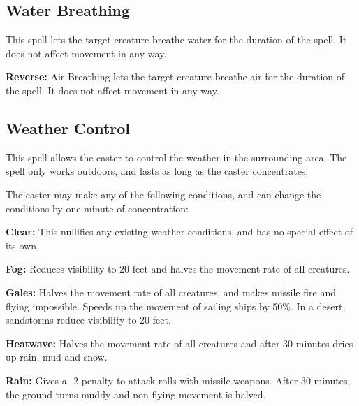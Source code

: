 \begin{multicols*}{2}
\subsection{Water Breathing}\label{spell:Water Breathing}

This spell lets the target creature breathe water for the duration of the spell. It does not affect movement in any way.

\textbf{Reverse:} Air Breathing lets the target creature breathe air for the duration of the spell. It does not affect movement in any way.

\subsection{Weather Control}\label{spell:Weather Control}

This spell allows the caster to control the weather in the surrounding area. The spell only works outdoors, and lasts as long as the caster concentrates.

The caster may make any of the following conditions, and can change the conditions by one minute of concentration:

\textbf{Clear:} This nullifies any existing weather conditions, and has no special effect of its own.

\textbf{Fog:} Reduces visibility to 20 feet and halves the movement rate of all creatures.

\textbf{Gales:} Halves the movement rate of all creatures, and makes missile fire and flying impossible. Speeds up the movement of sailing ships by 50\%. In a desert, sandstorms reduce visibility to 20 feet.

\textbf{Heatwave:} Halves the movement rate of all creatures and after 30 minutes dries up rain, mud and snow.

\textbf{Rain:} Gives a -2 penalty to attack rolls with missile weapons. After 30 minutes, the ground turns muddy and non-flying movement is halved.


\end{multicols*}
